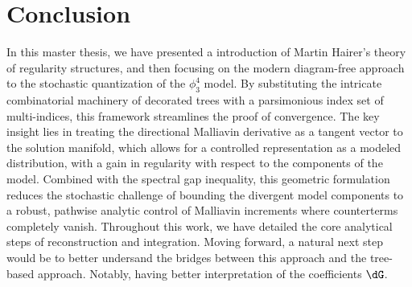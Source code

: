 \chapter{Conclusion}
In this master thesis, we have presented a introduction of Martin Hairer’s theory of regularity structures, and then focusing on the modern diagram-free approach to the stochastic quantization of the $\phi^4_3$ model. 
By substituting the intricate combinatorial machinery of decorated trees with a parsimonious index set of multi-indices, this framework streamlines the proof of convergence. The key insight lies in treating the directional Malliavin derivative as a tangent vector to the solution manifold, which allows for a controlled representation as a modeled distribution, with a gain in regularity with respect to the components of the model. 
Combined with the spectral gap inequality, this geometric formulation reduces the stochastic challenge of bounding the divergent model components to a robust, pathwise analytic control of Malliavin increments where counterterms completely vanish. 
Throughout this work, we have detailed the core analytical steps of reconstruction and integration. 
Moving forward, a natural next step would be to better undersand the bridges between this approach and the tree-based approach. Notably, having better interpretation of the coefficients $\dG$.
